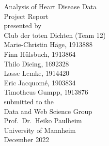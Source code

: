\documentclass[11pt,titlepage,oneside,openany]{book}
\begin{document}
\begin{titlepage}
	\vspace*{2cm}
  \begin{center}
   {\Large Analysis of Heart Disease Data\\}
   \vspace{2cm} 
   {Project Report\\}
   \vspace{2cm}
   {presented by\\
   	Club der toten Dichten (Team 12)\\
    Marie-Christin Häge, 1913888 \\
    Finn Hülsbuch, 1913864 \\
    Thilo Dieing, 1692328 \\
    Lasse Lemke, 1914420 \\
    Eric Jacquomé, 1903834 \\
    Timotheus Gumpp, 1913876 \\
   }
   \vspace{1cm} 
   {submitted to the\\
    Data and Web Science Group\\
    Prof.\ Dr.\ Heiko Paulheim\\
    University of Mannheim\\} \vspace{2cm}
   {December 2022}
  \end{center}
\end{titlepage} 

\tableofcontents





\newpage












\printbibliography


\pagestyle{plain}
\end{document}
